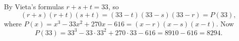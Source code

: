 By Vieta's formulas $r+s+t=33$, so
\[(r+s)(r+t)(s+t)=(33-t)(33-s)(33-r)=P(33),\]
where $P(x)=x^3-33x^2+270x-616=(x-r)(x-s)(x-t)$. Now
\[P(33)=33^3-33\cdot33^2+270\cdot33-616=8910-616=\boxed{8294}.\]
